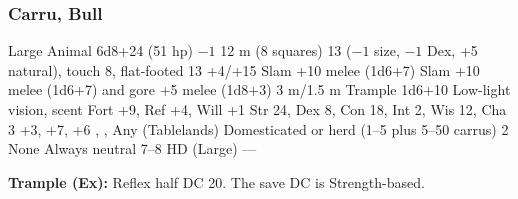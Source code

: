 \subsubsection{Carru, Bull}
\begin{MonsterStats}
{Large Animal}
{6d8+24 (51 hp)}
{$-1$}
{12 m (8 squares)}
{13 ($-1$ size, $-1$ Dex, +5 natural), touch 8, flat-footed 13}
{+4/+15}
{Slam +10 melee (1d6+7)}
{Slam +10 melee (1d6+7) and gore +5 melee (1d8+3)}
{3 m/1.5 m}
{Trample 1d6+10}
{Low-light vision, scent}
{Fort +9, Ref +4, Will +1}
{Str 24, Dex 8, Con 18, Int 2, Wis 12, Cha 3}
{ +3,  +7,  +6}
{, , }
{Any (Tablelands)}
{Domesticated or herd (1--5 plus 5--50 carrus)}
{2}
{None}
{Always neutral}
{7--8 HD (Large)}
{---}
\end{MonsterStats}

\textbf{Trample (Ex):} Reflex half DC 20. The save DC is Strength-based.
